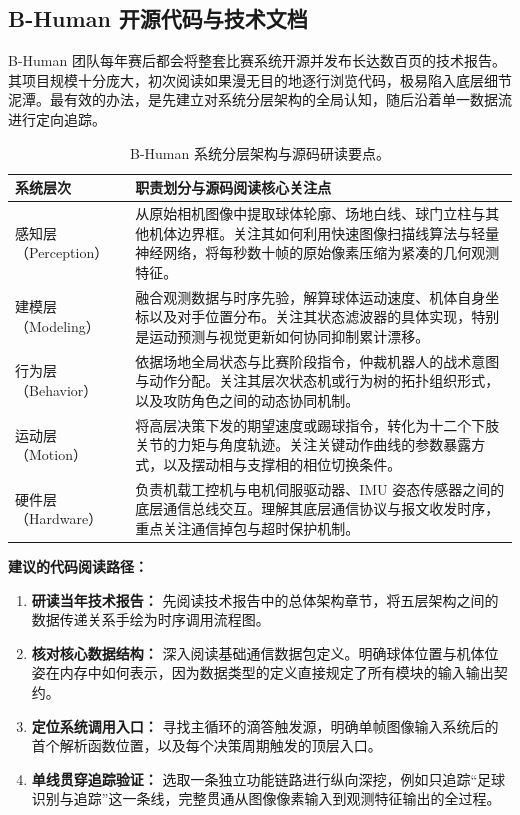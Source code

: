\subsection{B-Human 开源代码与技术文档}

B-Human 团队每年赛后都会将整套比赛系统开源并发布长达数百页的技术报告。其项目规模十分庞大，初次阅读如果漫无目的地逐行浏览代码，极易陷入底层细节泥潭。最有效的办法，是先建立对系统分层架构的全局认知，随后沿着单一数据流进行定向追踪。

\begin{table}[H]
\centering
\small
\begin{tabularx}{\textwidth}{p{3.2cm} X}
\toprule
\textbf{系统层次} & \textbf{职责划分与源码阅读核心关注点} \\
\midrule
感知层（Perception） & 从原始相机图像中提取球体轮廓、场地白线、球门立柱与其他机体边界框。关注其如何利用快速图像扫描线算法与轻量神经网络，将每秒数十帧的原始像素压缩为紧凑的几何观测特征。 \\
\addlinespace
建模层（Modeling） & 融合观测数据与时序先验，解算球体运动速度、机体自身坐标以及对手位置分布。关注其状态滤波器的具体实现，特别是运动预测与视觉更新如何协同抑制累计漂移。 \\
\addlinespace
行为层（Behavior） & 依据场地全局状态与比赛阶段指令，仲裁机器人的战术意图与动作分配。关注其层次状态机或行为树的拓扑组织形式，以及攻防角色之间的动态协同机制。 \\
\addlinespace
运动层（Motion） & 将高层决策下发的期望速度或踢球指令，转化为十二个下肢关节的力矩与角度轨迹。关注关键动作曲线的参数暴露方式，以及摆动相与支撑相的相位切换条件。 \\
\addlinespace
硬件层（Hardware） & 负责机载工控机与电机伺服驱动器、IMU 姿态传感器之间的底层通信总线交互。理解其底层通信协议与报文收发时序，重点关注通信掉包与超时保护机制。 \\
\bottomrule
\end{tabularx}
\caption{B-Human 系统分层架构与源码研读要点。}
\end{table}

\noindent\textbf{建议的代码阅读路径：}

\begin{enumerate}[leftmargin=*]
    \item \textbf{研读当年技术报告：} 先阅读技术报告中的总体架构章节，将五层架构之间的数据传递关系手绘为时序调用流程图。
    \item \textbf{核对核心数据结构：} 深入阅读基础通信数据包定义。明确球体位置与机体位姿在内存中如何表示，因为数据类型的定义直接规定了所有模块的输入输出契约。
    \item \textbf{定位系统调用入口：} 寻找主循环的滴答触发源，明确单帧图像输入系统后的首个解析函数位置，以及每个决策周期触发的顶层入口。
    \item \textbf{单线贯穿追踪验证：} 选取一条独立功能链路进行纵向深挖，例如只追踪“足球识别与追踪”这一条线，完整贯通从图像像素输入到观测特征输出的全过程。
\end{enumerate}

